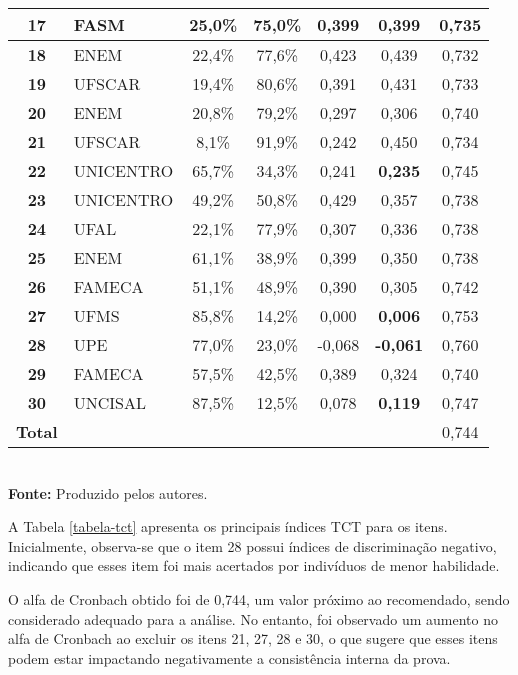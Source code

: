 \begin{table}[H]
\begin{tabular*}{\textwidth}{@{\extracolsep{\fill}}clccccc@{}}
\hline \textbf{17} & FASM & 25,0\% & 75,0\% & 0,399 & 0,399 & 0,735 \\ 
\hline \textbf{18} & ENEM & 22,4\% & 77,6\% & 0,423 & 0,439 & 0,732 \\ 
\hline \textbf{19} & UFSCAR & 19,4\% & 80,6\% & 0,391 & 0,431 & 0,733 \\ 
\hline \textbf{20} & ENEM & 20,8\% & 79,2\% & 0,297 & 0,306 & 0,740 \\ 
\hline \textbf{21} & UFSCAR & 8,1\% & 91,9\% & 0,242 & 0,450 & 0,734 \\ 
\hline \textbf{22} & UNICENTRO & 65,7\% & 34,3\% & 0,241 & \textbf{0,235} & 0,745 \\ 
\hline \textbf{23} & UNICENTRO & 49,2\% & 50,8\% & 0,429 & 0,357 & 0,738 \\ 
\hline \textbf{24} & UFAL & 22,1\% & 77,9\% & 0,307 & 0,336 & 0,738 \\ 
\hline \textbf{25} & ENEM & 61,1\% & 38,9\% & 0,399 & 0,350 & 0,738 \\ 
\hline \textbf{26} & FAMECA & 51,1\% & 48,9\% & 0,390 & 0,305 & 0,742 \\ 
\hline \textbf{27} & UFMS & 85,8\% & 14,2\% & 0,000 & \textbf{0,006} & 0,753 \\ 
\hline \textbf{28} & UPE & 77,0\% & 23,0\% & -0,068 & \textbf{-0,061} & 0,760 \\ 
\hline \textbf{29} & FAMECA & 57,5\% & 42,5\% & 0,389 & 0,324 & 0,740 \\ 
\hline \textbf{30} & UNCISAL & 87,5\% & 12,5\% & 0,078 & \textbf{0,119} & 0,747 \\
		\hline  \textbf{Total} &&&&&& 0,744 \\
			\bottomrule
		\end{tabular*}\\
		\vspace*{0.5cm}
		\small{\textbf{Fonte:} Produzido pelos autores.}
\end{table}


A Tabela \ref{tabela-tct} apresenta os principais índices TCT para os itens. Inicialmente, observa-se que o item 28 possui índices de discriminação negativo, indicando que esses item foi mais acertados por indivíduos de menor habilidade.


O alfa de Cronbach obtido foi de 0,744, um valor próximo ao recomendado, sendo considerado adequado para a análise. No entanto, foi observado um aumento no alfa de Cronbach ao excluir os itens 21, 27, 28 e 30, o que sugere que esses itens podem estar impactando negativamente a consistência interna da prova.


